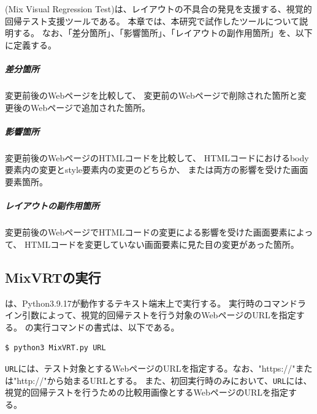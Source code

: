 \chapter{ \toolName}\label{cha:Function}
\toolName (Mix Visual Regression Test)は、レイアウトの不具合の発見を支援する、視覚的回帰テスト支援ツールである。
本章では、本研究で試作したツール\toolName について説明する。
なお、「差分箇所」、「影響箇所」、「レイアウトの副作用箇所」を、以下に定義する。
\paragraph{差分箇所}
変更前後のWebページを比較して、
変更前のWebページで削除された箇所と変更後のWebページで追加された箇所。
\paragraph{影響箇所}
変更前後のWebページのHTMLコードを比較して、
HTMLコードにおけるbody要素内の変更とstyle要素内の変更のどちらか、
または両方の影響を受けた画面要素箇所。
\paragraph{レイアウトの副作用箇所}
変更前後のWebページでHTMLコードの変更による影響を受けた画面要素によって、
HTMLコードを変更していない画面要素に見た目の変更があった箇所。
\par

\section{MixVRTの実行}\label{sec:MixVRT_execution}
\toolName は、Python3.9.17\cite{Python}が動作するテキスト端末上で実行する。
\toolName 実行時のコマンドライン引数によって、視覚的回帰テストを行う対象のWebページのURLを指定する。
\toolName の実行コマンドの書式は、以下である。
\begin{lstlisting}[label=list:command,frame=none,numbers=none,basicstyle={\normalsize \ttfamily \color[gray]{.15}}]
  $ python3 MixVRT.py URL
 \end{lstlisting}
{\tt URL}には、テスト対象とするWebページのURLを指定する。なお、"https://"または"http://"から始まるURLとする。
また、初回実行時のみにおいて、{\tt URL}には、視覚的回帰テストを行うための比較用画像とするWebページのURLを指定する。
\par

